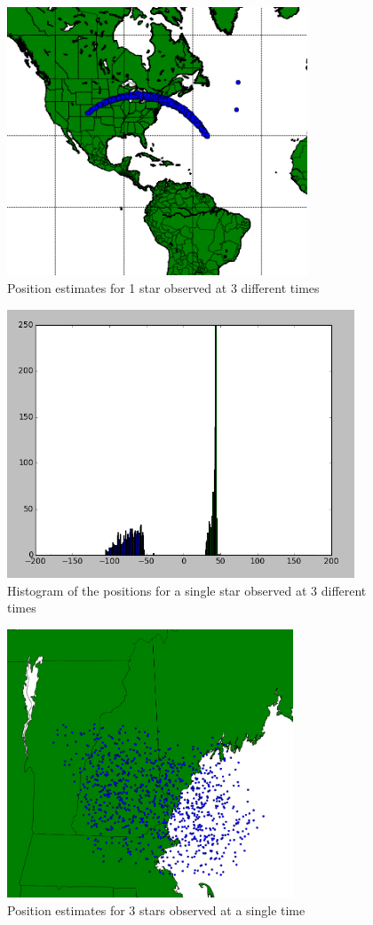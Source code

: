 \documentclass[]{aiaa-tc}%
\begin{document}
\begin{figure}[b!]
\centering
\includegraphics[height=8cm]{1s3t.png}
\caption{Position estimates for 1 star observed at 3 different times}
\label{f:1s3t}
\end{figure}
\begin{figure}[b!]
\centering
\includegraphics[height=8cm]{1s3t_hist.png}
\caption{Histogram of the positions for a single star observed at 3 different times}
\label{f:1s3t_hist}
\end{figure}
\begin{figure}[b!]
\centering
\includegraphics[height=8cm]{3s1t.png}
\caption{Position estimates for 3 stars observed at a single time}
\label{f:3s1t}
\end{figure}
\end{document}
